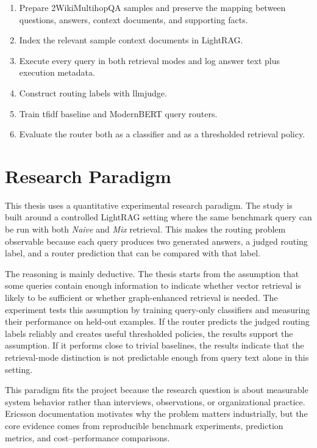 \documentclass[english, bibtex]{kththesis}               %
\numberwithin{listing}{chapter}
\begin{document}
\begin{enumerate}[leftmargin=*, label=\textbf{Step \arabic*}]
    \item Prepare 2WikiMultihopQA samples and preserve the mapping between questions, answers, context documents, and supporting facts.
    \item Index the relevant sample context documents in LightRAG.
    \item Execute every query in both retrieval modes and log answer text plus execution metadata.
    \item Construct routing labels with \gls{llmjudge}.
    \item Train \gls{tfidf} baseline and ModernBERT query routers.
    \item Evaluate the router both as a classifier and as a thresholded retrieval policy.
\end{enumerate}

\section{Research Paradigm}
\label{sec:researchParadigm}

This thesis uses a quantitative experimental research paradigm. The study is built around a controlled LightRAG setting where the same benchmark query can be run with both \emph{Naive} and \emph{Mix} retrieval. This makes the routing problem observable because each query produces two generated answers, a judged routing label, and a router prediction that can be compared with that label.

The reasoning is mainly deductive. The thesis starts from the assumption that some queries contain enough information to indicate whether vector retrieval is likely to be sufficient or whether graph-enhanced retrieval is needed. The experiment tests this assumption by training query-only classifiers and measuring their performance on held-out examples. If the router predicts the judged routing labels reliably and creates useful thresholded policies, the results support the assumption. If it performs close to trivial baselines, the results indicate that the retrieval-mode distinction is not predictable enough from query text alone in this setting.

This paradigm fits the project because the research question is about measurable system behavior rather than interviews, observations, or organizational practice. Ericsson documentation motivates why the problem matters industrially, but the core evidence comes from reproducible benchmark experiments, prediction metrics, and cost--performance comparisons.
\end{document}
